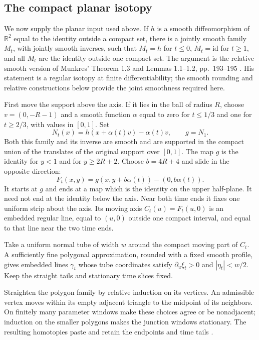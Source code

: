 \subsection{The compact planar isotopy}
\label{sec:neck-cap-planar-isotopy}

We now supply the planar input used above.  If $h$ is a smooth
diffeomorphism of $\mathbb R^2$ equal to the identity outside a compact
set, there is a jointly smooth family $M_t$, with jointly smooth inverses,
such that $M_t=h$ for $t\le0$, $M_t=\mathrm{id}$ for $t\ge1$, and
all $M_t$ are the identity outside one compact set.  The argument is the
relative smooth version of Munkres' Theorem 1.3 and Lemmas 1.1--1.2,
pp.~193--195 \cite[Theorem 1.3 and Lemmas 1.1--1.2, pp.~193--195]{Munkres1960}.
His statement is a regular isotopy at finite
differentiability; the smooth rounding and relative constructions below
provide the joint smoothness required here.

First move the support above the axis.  If it lies in the ball of radius
$R$, choose $v=(0,-R-1)$ and a smooth function $\alpha$ equal to zero
for $t\le1/3$ and one for $t\ge2/3$, with values in $[0,1]$.  Set
\[
 N_t(x)=h(x+\alpha(t)v)-\alpha(t)v,\qquad g=N_1.
\]
Both this family and its inverse are smooth and are supported in the
compact union of the translates of the original support over $[0,1]$.
The map $g$ is the identity for $y<1$ and for $y\ge2R+2$.
Choose $b=4R+4$ and slide in the opposite direction:
\[
 F_t(x,y)=g(x,y+b\alpha(t))-(0,b\alpha(t)).
\]
It starts at $g$ and ends at a map which is the identity on the upper
half-plane.  It need not end at the identity below the axis.  Near both
time ends it fixes one uniform strip about the axis.  Its moving axis
$C_t(u)=F_t(u,0)$ is an embedded regular line, equal to $(u,0)$ outside
one compact interval, and equal to that line near the two time ends.

Take a uniform normal tube of width $w$ around the compact moving part
of $C_t$.  A sufficiently fine polygonal approximation, rounded with a
fixed smooth profile, gives embedded lines $\gamma_t$ whose tube
coordinates satisfy $\partial_u\xi_t>0$ and $|\eta_t|<w/2$.
Keep the straight tails and stationary time slices fixed.

Straighten the polygon family by relative induction on its vertices.
An admissible vertex moves within its empty adjacent triangle to the
midpoint of its neighbors.  On finitely many parameter windows make these
choices agree or be nonadjacent; induction on the smaller polygons makes
the junction windows stationary.  The resulting homotopies paste and
retain the endpoints and time tails
\cite[Lemmas 2.3--2.7, pp.~195--197]{Munkres1960}.

